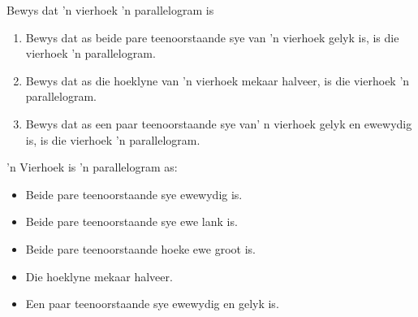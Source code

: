 \begin{Investigation}{Bewys dat 'n vierhoek 'n parallelogram is}
 \begin{enumerate}[label=\textbf{\arabic*}.]
 \item Bewys dat as beide pare teenoorstaande sye van 'n vierhoek gelyk is, is die vierhoek 'n parallelogram.

 \item Bewys dat as die hoeklyne van 'n vierhoek mekaar halveer, is die vierhoek 'n parallelogram.

 \item Bewys dat as een paar teenoorstaande sye van' n vierhoek gelyk en ewewydig is, is die vierhoek 'n parallelogram.
 \end{enumerate}
\end{Investigation}


\par    
'n Vierhoek is 'n parallelogram as:

\begin{itemize}[noitemsep]
 \item Beide pare teenoorstaande sye ewewydig is.
 \item Beide pare teenoorstaande sye ewe lank is.
 \item Beide pare teenoorstaande hoeke ewe groot is.
 \item Die hoeklyne mekaar halveer.
 \item Een paar teenoorstaande sye ewewydig en gelyk is.
\end{itemize}

